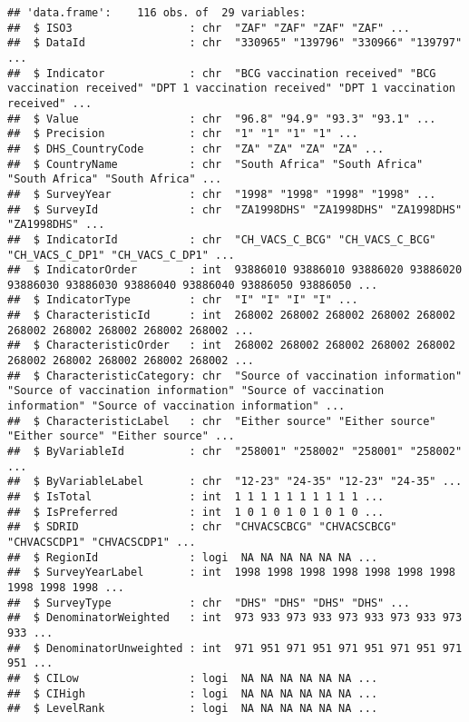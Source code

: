 \documentclass[
]{article}
\begin{document}
\begin{verbatim}
## 'data.frame':    116 obs. of  29 variables:
##  $ ISO3                  : chr  "ZAF" "ZAF" "ZAF" "ZAF" ...
##  $ DataId                : chr  "330965" "139796" "330966" "139797" ...
##  $ Indicator             : chr  "BCG vaccination received" "BCG vaccination received" "DPT 1 vaccination received" "DPT 1 vaccination received" ...
##  $ Value                 : chr  "96.8" "94.9" "93.3" "93.1" ...
##  $ Precision             : chr  "1" "1" "1" "1" ...
##  $ DHS_CountryCode       : chr  "ZA" "ZA" "ZA" "ZA" ...
##  $ CountryName           : chr  "South Africa" "South Africa" "South Africa" "South Africa" ...
##  $ SurveyYear            : chr  "1998" "1998" "1998" "1998" ...
##  $ SurveyId              : chr  "ZA1998DHS" "ZA1998DHS" "ZA1998DHS" "ZA1998DHS" ...
##  $ IndicatorId           : chr  "CH_VACS_C_BCG" "CH_VACS_C_BCG" "CH_VACS_C_DP1" "CH_VACS_C_DP1" ...
##  $ IndicatorOrder        : int  93886010 93886010 93886020 93886020 93886030 93886030 93886040 93886040 93886050 93886050 ...
##  $ IndicatorType         : chr  "I" "I" "I" "I" ...
##  $ CharacteristicId      : int  268002 268002 268002 268002 268002 268002 268002 268002 268002 268002 ...
##  $ CharacteristicOrder   : int  268002 268002 268002 268002 268002 268002 268002 268002 268002 268002 ...
##  $ CharacteristicCategory: chr  "Source of vaccination information" "Source of vaccination information" "Source of vaccination information" "Source of vaccination information" ...
##  $ CharacteristicLabel   : chr  "Either source" "Either source" "Either source" "Either source" ...
##  $ ByVariableId          : chr  "258001" "258002" "258001" "258002" ...
##  $ ByVariableLabel       : chr  "12-23" "24-35" "12-23" "24-35" ...
##  $ IsTotal               : int  1 1 1 1 1 1 1 1 1 1 ...
##  $ IsPreferred           : int  1 0 1 0 1 0 1 0 1 0 ...
##  $ SDRID                 : chr  "CHVACSCBCG" "CHVACSCBCG" "CHVACSCDP1" "CHVACSCDP1" ...
##  $ RegionId              : logi  NA NA NA NA NA NA ...
##  $ SurveyYearLabel       : int  1998 1998 1998 1998 1998 1998 1998 1998 1998 1998 ...
##  $ SurveyType            : chr  "DHS" "DHS" "DHS" "DHS" ...
##  $ DenominatorWeighted   : int  973 933 973 933 973 933 973 933 973 933 ...
##  $ DenominatorUnweighted : int  971 951 971 951 971 951 971 951 971 951 ...
##  $ CILow                 : logi  NA NA NA NA NA NA ...
##  $ CIHigh                : logi  NA NA NA NA NA NA ...
##  $ LevelRank             : logi  NA NA NA NA NA NA ...
\end{verbatim}
\end{document}
